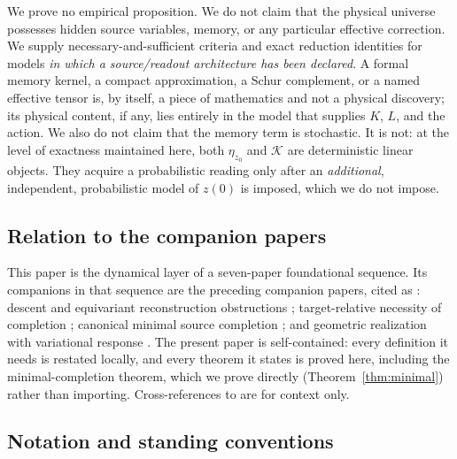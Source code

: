\documentclass[11pt,reqno]{amsart}
\numberwithin{equation}{section}
\theoremstyle{plain}
\theoremstyle{definition}
\theoremstyle{remark}
\newcommand{\Kmem}{\mathcal{K}}
\begin{document}
We prove no empirical proposition. We do not claim that the physical universe possesses
hidden source variables, memory, or any particular effective correction. We supply
necessary-and-sufficient criteria and exact reduction identities for models \emph{in which
a source/readout architecture has been declared}. A formal memory kernel, a compact
approximation, a Schur complement, or a named effective tensor is, by itself, a piece of
mathematics and not a physical discovery; its physical content, if any, lies entirely in
the model that supplies $K$, $L$, and the action. We also do not claim that the memory
term is stochastic. It is not: at the level of exactness maintained here, both
$\eta_{z_0}$ and $\Kmem$ are deterministic linear objects. They acquire a probabilistic
reading only after an \emph{additional}, independent, probabilistic model of $z(0)$ is
imposed, which we do not impose.

\subsection{Relation to the companion papers}

This paper is the dynamical layer of a seven-paper foundational sequence. Its companions in
that sequence are the preceding companion papers, cited as
\cite{Paper1,Paper2,Paper3,Paper4}: descent and equivariant reconstruction obstructions
\cite{Paper1}; target-relative necessity of completion \cite{Paper2}; canonical minimal
source completion \cite{Paper3}; and geometric realization with variational response
\cite{Paper4}. The present paper is self-contained: every definition it needs is restated
locally, and every theorem it states is proved here, including the minimal-completion
theorem, which we prove directly (Theorem~\ref{thm:minimal}) rather than importing.
Cross-references to \cite{Paper1,Paper2,Paper3,Paper4} are for context only.

\subsection{Notation and standing conventions}
\label{subsec:notation}
\end{document}
